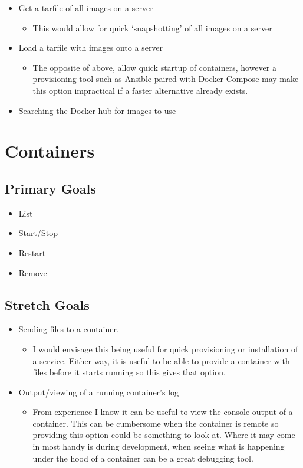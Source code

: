 \documentclass{article}
\begin{document}
\begin{itemize}
	\item Get a tarfile of all images on a server
	\begin{itemize}
		\item This would allow for quick `snapshotting' of all images on a server
	\end{itemize}
	\item Load a tarfile with images onto a server
	\begin{itemize}
		\item The opposite of above, allow quick startup of containers, however a provisioning tool such as Ansible paired with Docker Compose may make this option impractical if a faster alternative already exists.
	\end{itemize}
	\item Searching the Docker hub for images to use
\end{itemize}

\newpage

\section{Containers}

\subsection{Primary Goals}
\begin{itemize}
	\item List
	\item Start/Stop
	\item Restart
	\item Remove
\end{itemize}
\subsection{Stretch Goals}
\begin{itemize}
	\item Sending files to a container.
	\begin{itemize}
		\item I would envisage this being useful for quick provisioning or installation of a service. Either way, it is useful to be able to provide a container with files before it starts running so this gives that option.
	\end{itemize}
	\item Output/viewing of a running container's log
	\begin{itemize}
		\item From experience I know it can be useful to view the console output of a container. This can be cumbersome when the container is remote so providing this option could be something to look at. Where it may come in most handy is during development, when seeing what is happening under the hood of a container can be a great debugging tool.
	\end{itemize}
\end{itemize}
\end{document}
